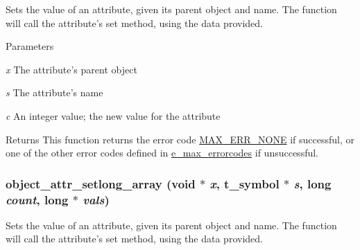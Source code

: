 Sets the value of an attribute, given its parent object and name. The function will call the attribute's {\ttfamily set} method, using the data provided.


\begin{DoxyParams}{Parameters}
\item[{\em x}]The attribute's parent object \item[{\em s}]The attribute's name \item[{\em c}]An integer value; the new value for the attribute\end{DoxyParams}
\begin{DoxyReturn}{Returns}
This function returns the error code \hyperlink{group__misc_gga0764dd6c02b76cca7d053ae50555d69da6d22f77fef8b1e1b074cef5d29d935fd}{MAX\_\-ERR\_\-NONE} if successful, or one of the other error codes defined in \hyperlink{group__misc_ga0764dd6c02b76cca7d053ae50555d69d}{e\_\-max\_\-errorcodes} if unsuccessful. 
\end{DoxyReturn}
\hypertarget{group__attr_ga30c017d5fdf58b59f81a3888f4de2771}{
\subsubsection[{object\_\-attr\_\-setlong\_\-array}]{ object\_\-attr\_\-setlong\_\-array (void $\ast$ {\em x}, \/  {\bf t\_\-symbol} $\ast$ {\em s}, \/  long {\em count}, \/  long $\ast$ {\em vals})}}
\label{group__attr_ga30c017d5fdf58b59f81a3888f4de2771}


Sets the value of an attribute, given its parent object and name. The function will call the attribute's {\ttfamily set} method, using the data provided.



